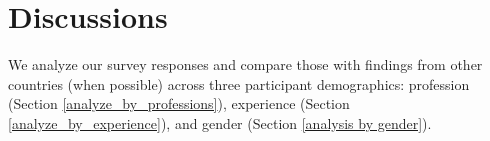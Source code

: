 \section{Discussions}
\label{discussions}
We analyze our survey responses and compare those with findings from other countries (when possible) across three participant demographics: profession (Section \ref{analyze_by_professions}), 
experience (Section \ref{analyze_by_experience}), and gender (Section \ref{analysis by gender}). 






% 
